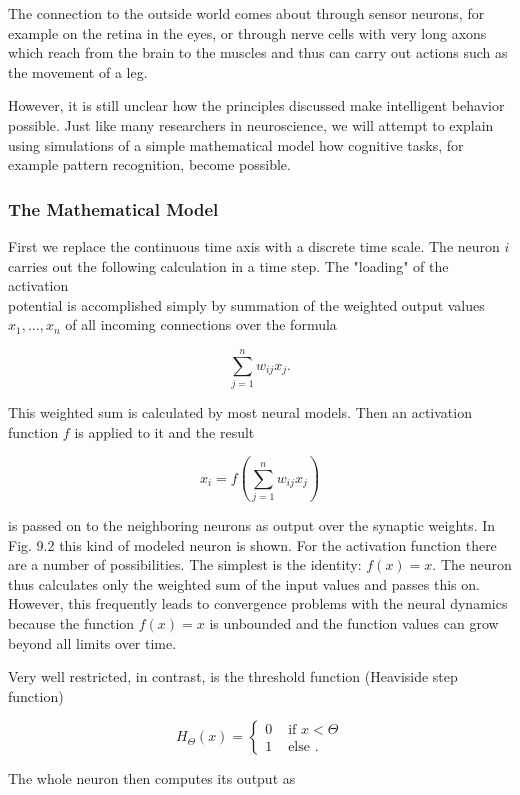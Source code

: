 \documentclass[10pt]{book}
\begin{document}
The connection to the outside world comes about through sensor neurons, for example on the retina in the eyes, or through nerve cells with very long axons which reach from the brain to the muscles and thus can carry out actions such as the movement of a leg.

However, it is still unclear how the principles discussed make intelligent behavior possible. Just like many researchers in neuroscience, we will attempt to explain using simulations of a simple mathematical model how cognitive tasks, for example pattern recognition, become possible.

\subsubsection*{The Mathematical Model}
First we replace the continuous time axis with a discrete time scale. The neuron $i$ carries out the following calculation in a time step. The "loading" of the activation\\
potential is accomplished simply by summation of the weighted output values $x_{1}, \ldots, x_{n}$ of all incoming connections over the formula


$$
\sum_{j=1}^{n} w_{i j} x_{j} .
$$

This weighted sum is calculated by most neural models. Then an activation function $f$ is applied to it and the result

$$
x_{i}=f\left(\sum_{j=1}^{n} w_{i j} x_{j}\right)
$$

is passed on to the neighboring neurons as output over the synaptic weights. In Fig. 9.2 this kind of modeled neuron is shown. For the activation function there are a number of possibilities. The simplest is the identity: $f(x)=x$. The neuron thus calculates only the weighted sum of the input values and passes this on. However, this frequently leads to convergence problems with the neural dynamics because the function $f(x)=x$ is unbounded and the function values can grow beyond all limits over time.

Very well restricted, in contrast, is the threshold function (Heaviside step function)

$$
H_{\Theta}(x)= \begin{cases}0 & \text { if } x<\Theta \\ 1 & \text { else } .\end{cases}
$$

The whole neuron then computes its output as
\end{document}
